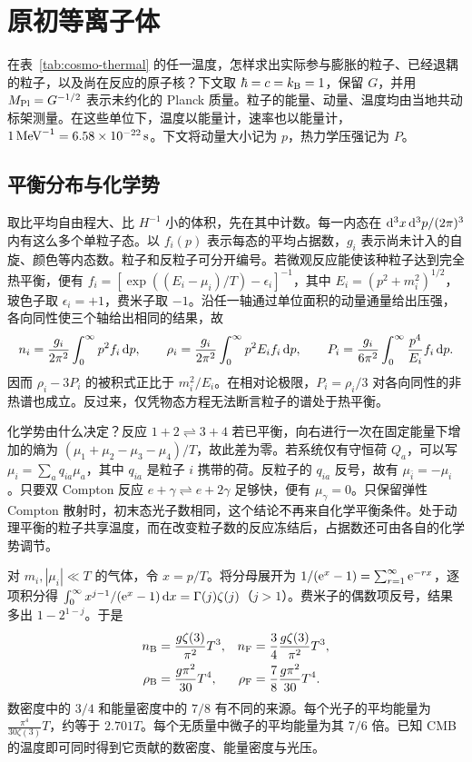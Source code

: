\section{原初等离子体}\label{sec:cosmo-plasma}

在表~\ref{tab:cosmo-thermal} 的任一温度，怎样求出实际参与膨胀的粒子、已经退耦的粒子，以及尚在反应的原子核？下文取 $\hbar=c=k_{\rm B}=1$，保留 $G$，并用 $M_{\rm Pl}=G^{-1/2}$ 表示未约化的 Planck 质量。粒子的能量、动量、温度均由当地共动标架测量。在这些单位下，温度以能量计，速率也以能量计，$1\,{\rm MeV}^{-1}=6.58\times10^{-22}\,{\rm s}$。下文将动量大小记为 $p$，热力学压强记为 $P$。

\subsection{平衡分布与化学势}

取比平均自由程大、比 $H^{-1}$ 小的体积，先在其中计数。每一内态在 $\dd^3x\,\dd^3p/(2\pi)^3$ 内有这么多个单粒子态。以 $f_i(p)$ 表示每态的平均占据数，$g_i$ 表示尚未计入的自旋、颜色等内态数。粒子和反粒子可分开编号。若微观反应能使该种粒子达到完全热平衡，便有 $f_i=[\exp((E_i-\mu_i)/T)-\epsilon_i]^{-1}$，其中 $E_i=(p^2+m_i^2)^{1/2}$，玻色子取 $\epsilon_i=+1$，费米子取 $-1$。沿任一轴通过单位面积的动量通量给出压强，各向同性使三个轴给出相同的结果，故
\begin{equation}\label{eq:cosmo-phase-moments}
 n_i=\frac{g_i}{2\pi^2}\int_0^\infty p^2 f_i\,\dd p,\qquad
 \rho_i=\frac{g_i}{2\pi^2}\int_0^\infty p^2 E_i f_i\,\dd p,\qquad
 P_i=\frac{g_i}{6\pi^2}\int_0^\infty\frac{p^4}{E_i} f_i\,\dd p .
\end{equation}
因而 $\rho_i-3P_i$ 的被积式正比于 $m_i^2/E_i$。在相对论极限，$P_i=\rho_i/3$ 对各向同性的非热谱也成立。反过来，仅凭物态方程无法断言粒子的谱处于热平衡。

化学势由什么决定？反应 $1+2\rightleftharpoons3+4$ 若已平衡，向右进行一次在固定能量下增加的熵为 $(\mu_1+\mu_2-\mu_3-\mu_4)/T$，故此差为零。若系统仅有守恒荷 $Q_a$，可以写 $\mu_i=\sum_a q_{ia}\mu_a$，其中 $q_{ia}$ 是粒子 $i$ 携带的荷。反粒子的 $q_{ia}$ 反号，故有 $\mu_{\bar i}=-\mu_i$。只要双 Compton 反应 $e+\gamma\rightleftharpoons e+2\gamma$ 足够快，便有 $\mu_\gamma=0$。只保留弹性 Compton 散射时，初末态光子数相同，这个结论不再来自化学平衡条件。处于动理平衡的粒子共享温度，而在改变粒子数的反应冻结后，占据数还可由各自的化学势调节。

对 $m_i,|\mu_i|\ll T$ 的气体，令 $x=p/T$。将分母展开为 $1/(\mathrm{e}^x-1)=\sum_{r=1}^\infty\mathrm{e}^{-rx}$，逐项积分得 $\int_0^\infty x^{j-1}/(\mathrm{e}^x-1)\,\dd x=\Gamma(j)\zeta(j)$（$j>1$）。费米子的偶数项反号，结果多出 $1-2^{1-j}$。于是
\begin{equation}\label{eq:cosmo-eq-gas}
 \begin{aligned}
 n_{\rm B}&=\frac{g\zeta(3)}{\pi^2}T^3, &
 n_{\rm F}&=\frac34\frac{g\zeta(3)}{\pi^2}T^3,\\
 \rho_{\rm B}&=\frac{g\pi^2}{30}T^4, &
 \rho_{\rm F}&=\frac78\frac{g\pi^2}{30}T^4 .
 \end{aligned}
\end{equation}
数密度中的 $3/4$ 和能量密度中的 $7/8$ 有不同的来源。每个光子的平均能量为 $\frac{\pi^4}{30\zeta(3)}T$，约等于 $2.701T$。每个无质量中微子的平均能量为其 $7/6$ 倍。已知 CMB 的温度即可同时得到它贡献的数密度、能量密度与光压。

